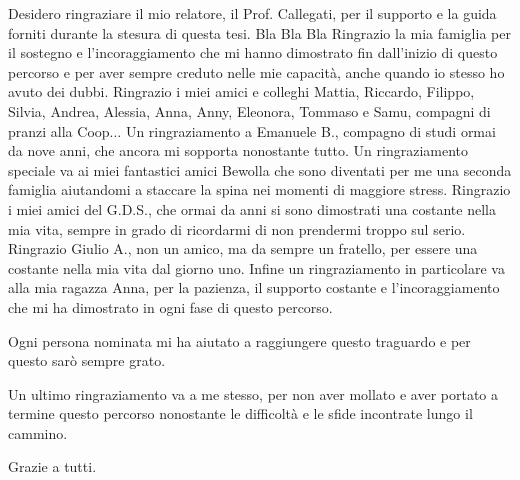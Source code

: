\documentclass[12pt,a4paper,openright,twoside]{book}
\begin{document}

\backmatter

\nocite{*} %


    

\begin{acknowledgements} %
    Desidero ringraziare il mio relatore, il Prof. Callegati, per il supporto e la guida forniti durante la stesura di questa tesi. Bla Bla Bla
    Ringrazio la mia famiglia per il sostegno e l'incoraggiamento che mi hanno dimostrato fin dall'inizio di questo percorso e per aver sempre creduto nelle mie capacità, anche quando io stesso ho avuto dei dubbi.
    Ringrazio i miei amici e colleghi Mattia, Riccardo, Filippo, Silvia, Andrea, Alessia, Anna, Anny, Eleonora, Tommaso e Samu, compagni di pranzi alla Coop... 
    Un ringraziamento a Emanuele B., compagno di studi ormai da nove anni, che ancora mi sopporta nonostante tutto.
    Un ringraziamento speciale va ai miei fantastici amici Bewolla che sono diventati per me una seconda famiglia aiutandomi a staccare la spina nei momenti di maggiore stress.
    Ringrazio i miei amici del G.D.S., che ormai da anni si sono dimostrati una costante nella mia vita, sempre in grado di ricordarmi di non prendermi troppo sul serio.
    Ringrazio Giulio A., non un amico, ma da sempre un fratello, per essere una costante nella mia vita dal giorno uno.
    Infine un ringraziamento in particolare va alla mia ragazza Anna, per la pazienza, il supporto costante e l’incoraggiamento che mi ha dimostrato in ogni fase di questo percorso.

    Ogni persona nominata mi ha aiutato a raggiungere questo traguardo e per questo sarò sempre grato.

    Un ultimo ringraziamento va a me stesso, per non aver mollato e aver portato a termine questo percorso nonostante le difficoltà e le sfide incontrate lungo il cammino.

    Grazie a tutti.
\end{acknowledgements}
\end{document}
